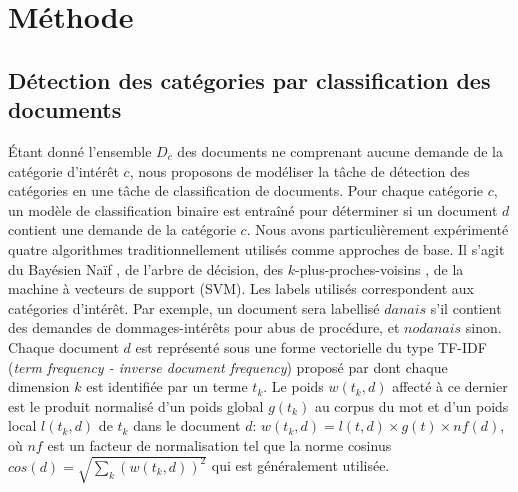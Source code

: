 \section{Méthode}

\subsection{Détection des catégories par classification des documents}

Étant donné l'ensemble $D_{\overline{c}}$ des documents ne comprenant aucune demande de la catégorie d'intérêt $c$, nous proposons de modéliser la tâche de détection des catégories en une tâche de classification de documents. Pour chaque catégorie $c$, un modèle de classification binaire est entraîné pour déterminer si un document $d$ contient une demande de la catégorie $c$. Nous avons particulièrement expérimenté quatre algorithmes traditionnellement utilisés comme approches de base. Il s'agit du Bayésien Naïf , de l'arbre de décision, des $k$-plus-proches-voisins \citep{cover1967knn}, de la machine à vecteurs de support (SVM). Les labels utilisés correspondent aux catégories d'intérêt. Par exemple, un document sera labellisé $danais$ s'il contient des demandes de dommages-intérêts pour abus de procédure, et $nodanais$ sinon. Chaque document $d$ est représenté sous une forme vectorielle du type TF-IDF (\textit{term frequency - inverse document frequency}) proposé par \cite{salton1988term-weighting} dont chaque dimension $k$ est identifiée par un terme $t_k$. Le poids $w(t_k, d)$ affecté à ce dernier est le produit normalisé d'un poids global $g(t_k)$ au corpus du mot et d'un poids local $l(t_k,d)$ de $t_k$ dans le document $d$: $w(t_k, d) = l(t,d) \times g(t) \times nf(d)$, où $nf$ est un facteur de normalisation tel que la norme cosinus $cos(d) = \sqrt{\sum\limits_k (w(t_k,d))^2}$ qui est généralement utilisée. 

